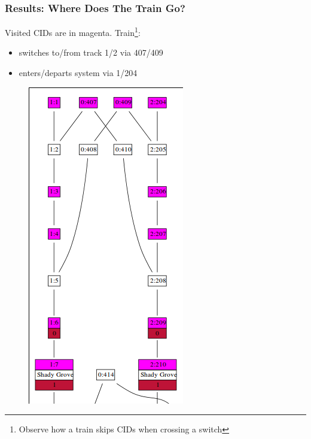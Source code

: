 \documentclass[t]{beamer}
\begin{document}
\begin{frame}
\frametitle{Results: Where Does The Train Go?}

Visited CIDs are in magenta.  Train\footnote{Observe how a train skips CIDs when crossing a switch}:
\begin{itemize}
\item switches to/from track 1/2 via 407/409
\item enters/departs system via 1/204
\end{itemize}

\begin{center}
\begin{figure}
  \includegraphics[scale=0.45]{red_line_end.png}
\end{figure}
\end{center}

\end{frame}
\end{document}
